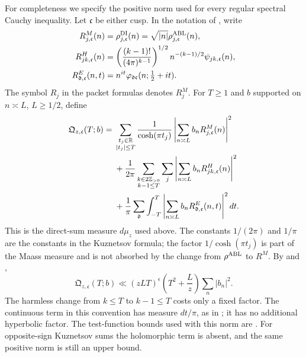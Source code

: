For completeness we specify the positive norm used for every regular
spectral Cauchy inequality. Let $\mathfrak c$ be either cusp. In the
notation of \cite[Proposition E]{Pascadi}, write
\begin{align*}
 R^M_{j,\mathfrak c}(n)&=
       \rho^{\rm DI}_{j,\mathfrak c}(n)
       =\sqrt{|n|}\rho^{\rm ABL}_{j,\mathfrak c}(n),\\
 R^H_{jk,\mathfrak c}(n)&=
       \left(\frac{(k-1)!}{(4\pi)^{k-1}}\right)^{1/2}
       n^{-(k-1)/2}\psi_{jk,\mathfrak c}(n),\\
 R^E_{\mathfrak d,\mathfrak c}(n,t)&=
       n^{it}\varphi_{\mathfrak d\mathfrak c}
                       (n;\tfrac12+it).
\end{align*}
The symbol $R_j$ in the packet formulas denotes $R_j^M$.
For $T\ge1$ and $b$ supported on $n\asymp L$, $L\ge1/2$, define
\begin{align}\label{ana:regular-norm}
 \mathfrak Q_{z,\mathfrak c}(T;b)
 ={}&\sum_{\substack{t_j\in\mathbb R\\|t_j|\le T}}
 \frac1{\cosh(\pi t_j)}
 \left|\sum_{n\asymp L}b_nR^M_{j,\mathfrak c}(n)\right|^2\notag\\
 &+\frac1{2\pi}\sum_{\substack{k\in2\mathbb Z_{>0}\\k-1\le T}}
      \sum_j\left|\sum_{n\asymp L}b_nR^H_{jk,\mathfrak c}(n)\right|^2
       \notag\\
 &+\frac1\pi\sum_{\mathfrak d}\int_{-T}^T
      \left|\sum_{n\asymp L}b_n
                 R^E_{\mathfrak d,\mathfrak c}(n,t)\right|^2dt.
\end{align}
This is the direct-sum measure $d\mu_z$ used above. The constants
$1/(2\pi)$ and $1/\pi$ are the constants in the Kuznetsov formula;
the factor $1/\cosh(\pi t_j)$ is part of the Maass measure and is
not absorbed by the change from $\rho^{\rm ABL}$ to $R^M$.
By \cite[Proposition 4.7]{Drappeau} and
\cite[Lemma H]{Pascadi},
\begin{equation}\label{ana:regular-large-sieve}
 \mathfrak Q_{z,\mathfrak c}(T;b)
 \ll (zLT)^\epsilon\left(T^2+\frac Lz\right)\sum_n|b_n|^2.
\end{equation}
The harmless change from $k\le T$ to $k-1\le T$ costs only a fixed
factor. The continuous term in this convention has measure $dt/\pi$,
as in \cite[(3.27)]{Pascadi}; it has no additional hyperbolic factor.
The test-function bounds used with this norm are
\cite[Lemma D]{Pascadi}. For opposite-sign Kuznetsov sums the
holomorphic term is absent, and the same positive norm is still an
upper bound.

